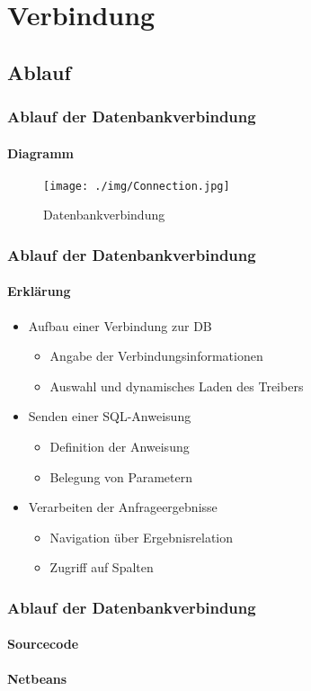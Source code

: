 \documentclass[class=beamer, crop=false]{standalone}
\begin{document}
\section{Verbindung}
\subsection{Ablauf}
\begin{frame}
	\frametitle{Ablauf der Datenbankverbindung}
	\framesubtitle{Diagramm}
	\begin{center}
	\begin{figure}
  		\texttt{[image: ./img/Connection.jpg]}
  		\caption{Datenbankverbindung}
  		\label{Datenbankverbindung}
	\end{figure}
	\end{center}
\end{frame}
\begin{frame}
	\frametitle{Ablauf der Datenbankverbindung}
	\framesubtitle{Erklärung}
	\begin{itemize}
		\item Aufbau einer Verbindung zur DB
		\begin{itemize}
			\item Angabe der Verbindungsinformationen
			\item Auswahl und dynamisches Laden des Treibers
		\end{itemize}
	\item Senden einer SQL-Anweisung
		\begin{itemize}
			\item Definition der Anweisung
			\item Belegung von Parametern
		\end{itemize}
	\item Verarbeiten der Anfrageergebnisse
		\begin{itemize}
			\item Navigation über Ergebnisrelation
			\item Zugriff auf Spalten
		\end{itemize}
	\end{itemize}
\end{frame}

\begin{frame}
	\frametitle{Ablauf der Datenbankverbindung}
	\framesubtitle{Sourcecode}
	\begin{center}
		\textbf{Netbeans}
	\end{center}
\end{frame}
\end{document}
